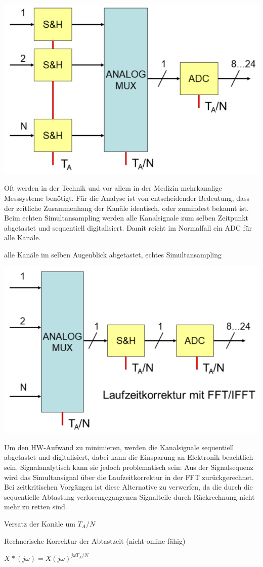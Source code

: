 \documentclass[a4paper]{article}
\begin{document}
\begin{multicols}{3}
  \begin{itemize*}
    \item \includegraphics[width=.5\linewidth]{Assets/Biosignalverarbeitung-Mehrkanalsysteme.png}
    \item Oft werden in der Technik und vor allem in der Medizin mehrkanalige Messsysteme benötigt. Für die Analyse ist von entscheidender Bedeutung, dass der zeitliche Zusammenhang der Kanäle identisch, oder zumindest bekannt ist. Beim echten Simultansampling werden alle Kanalsignale zum selben Zeitpunkt abgetastet und sequentiell digitalisiert. Damit reicht im Normalfall ein ADC für alle Kanäle.
    \begin{itemize*}
      \item alle Kanäle im selben Augenblick abgetastet, echtes Simultansampling
    \end{itemize*}
    \item \includegraphics[width=.5\linewidth]{Assets/Biosignalverarbeitung-Mehrkanalsysteme3.png}
    \begin{itemize*}
      \item Um den HW-Aufwand zu minimieren, werden die Kanalsignale sequentiell abgetastet und digitalisiert, dabei kann die Einsparung an Elektronik beachtlich sein. Signalanalytisch kann sie jedoch problematisch sein: Aus der Signalsequenz wird das Simultansignal über die Laufzeitkorrektur in der FFT zurückgerechnet. Bei zeitkritischen Vorgängen ist diese Alternative zu verwerfen, da die durch die sequentielle Abtastung verlorengegangenen Signalteile durch Rückrechnung nicht mehr zu retten sind.
    \end{itemize*}
    \begin{itemize*}
      \item Versatz der Kanäle um $T_A/N$
      \item Rechnerische Korrektur der Abtastzeit (nicht-online-fähig)
      \item $X^{}*(j\omega)=X(j\omega)^{j\omega T_A/N}$
    \end{itemize*}
  \end{itemize*}



\end{multicols}
\end{document}
